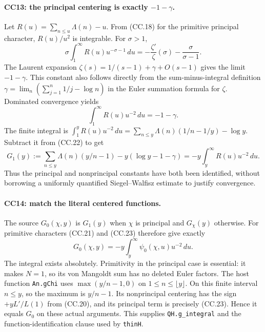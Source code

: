 \paragraph{CC13: the principal centering is exactly $-1-\gamma$.}
Let $R(u)=\sum_{n\le u}\Lambda(n)-u$. From (CC.18) for
the primitive principal character, $R(u)/u^2$ is integrable.
For $\sigma>1$,
\[
 \sigma\int_1^\infty R(u)u^{-\sigma-1}\,du
        =-\frac{\zeta'}\zeta(\sigma)-\frac{\sigma}{\sigma-1}.
\]
The Laurent expansion
$\zeta(s)=1/(s-1)+\gamma+O(s-1)$ gives the limit $-1-\gamma$.
This constant also follows directly from the sum-minus-integral
definition $\gamma=\lim_n(\sum_{j=1}^n1/j-\log n)$ in the
Euler summation formula for $\zeta$. Dominated convergence yields
\[
                      \int_1^\infty R(u)u^{-2}\,du=-1-\gamma.
                                                               \tag{CC.22}
\]
The finite integral is
$\int_1^y R(u)u^{-2}\,du
=\sum_{n\le y}\Lambda(n)(1/n-1/y)-\log y$.
Subtract it from (CC.22) to get
\[
 G_1(y):=\sum_{n\le y}\Lambda(n)(y/n-1)
                    -y(\log y-1-\gamma)
                       =-y\int_y^\infty R(u)u^{-2}\,du.
                                                               \tag{CC.23}
\]
Thus the principal and nonprincipal constants have both been
identified, without borrowing a uniformly quantified
Siegel--Walfisz estimate to justify convergence.

\paragraph{CC14: match the literal centered functions.}
The source $G_0(\chi,y)$ is $G_1(y)$ when $\chi$ is principal
and $G_\chi(y)$ otherwise. For primitive characters (CC.21)
and (CC.23) therefore give exactly
\[
             G_0(\chi,y)=-y\int_y^\infty
                           \psi_0(\chi,u)u^{-2}\,du.    \tag{CC.24}
\]
The integral exists absolutely. Primitivity in the principal
case is essential: it makes $N=1$, so its von Mangoldt sum
has no deleted Euler factors.
The host function \texttt{An.gChi} uses
$\max(y/n-1,0)$ on $1\le n\le\lfloor y\rfloor$.
On this finite interval $n\le y$, so the maximum is $y/n-1$.
Its nonprincipal centering has the sign $+yL'/L(1)$ from
(CC.20), and its principal term is precisely (CC.23).
Hence it equals $G_0$ on these actual arguments. This supplies
\texttt{QH.g\_integral} and the function-identification clause
used by \texttt{thinH}.

